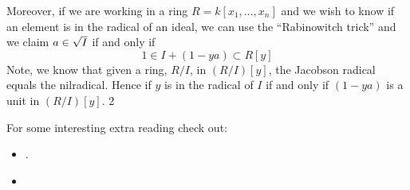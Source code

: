 \documentclass{ximera}
\begin{document}
Moreover, if we are working in a ring $R=k[x_1,\dots,x_n]$ and we wish
to know if an element is in the radical of an ideal, we can use the
``Rabinowitch trick''  and we claim $a\in
\sqrt{I}$ if and only if
\[
1 \in I + (1-ya) \subset R[y]
\]
Note, we know that given a ring, $R/I$, in $(R/I)[y]$, the Jacobson
radical equals the nilradical. Hence if $y$ is in the radical of $I$
if and only if $(1-ya)$ is a unit in $(R/I)[y]$.
2


For some interesting extra reading check out:
\begin{itemize}
\item {}.

\item {}


\end{itemize}
\end{document}
